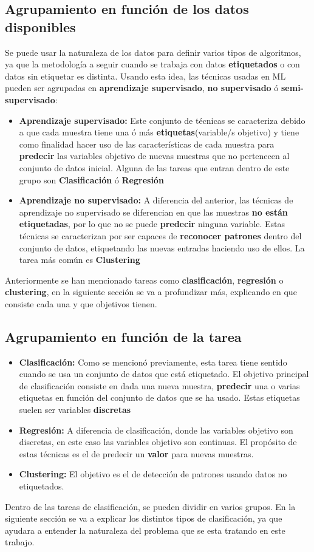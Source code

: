 \subsection{Agrupamiento en función de los datos disponibles}
Se puede usar la naturaleza de los datos para definir varios tipos de algoritmos, ya que la metodología a seguir cuando se trabaja con datos \textbf{etiquetados} o con datos sin etiquetar es distinta. Usando esta idea, las técnicas usadas en ML pueden ser agrupadas en \textbf{aprendizaje supervisado}, \textbf{no supervisado} ó \textbf{semi-supervisado}:
\begin{itemize}
	\item \textbf{Aprendizaje supervisado:} Este conjunto de técnicas se caracteriza debido a que cada muestra tiene una ó más \textbf{etiquetas}(variable/s objetivo) y tiene como finalidad hacer uso de las características de cada muestra para \textbf{predecir} las variables objetivo de nuevas muestras que no pertenecen al conjunto de datos inicial. Alguna de las tareas que entran dentro de este grupo son \textbf{Clasificación} ó \textbf{Regresión}
	\item \textbf{Aprendizaje no supervisado:} A diferencia del anterior, las técnicas de aprendizaje no supervisado se diferencian en que las muestras \textbf{no están etiquetadas}, por lo que no se puede \textbf{predecir} ninguna variable. Estas técnicas se caracterizan por ser capaces de \textbf{reconocer patrones} dentro del conjunto de datos, etiquetando las nuevas entradas haciendo uso de ellos. La tarea más común es \textbf{Clustering}
\end{itemize}
Anteriormente se han mencionado tareas como \textbf{clasificación}, \textbf{regresión} o \textbf{clustering}, en la siguiente sección se va a profundizar más, explicando en que consiste cada una y que objetivos tienen.
\subsection{Agrupamiento en función de la tarea}
\begin{itemize}
	\item \textbf{Clasificación:} Como se mencionó previamente, esta tarea tiene sentido cuando se usa un conjunto de datos que está etiquetado. El objetivo principal de clasificación consiste en dada una nueva muestra, \textbf{predecir} una o varias etiquetas en función del conjunto de datos que se ha usado. Estas etiquetas suelen ser variables \textbf{discretas}
	\item \textbf{Regresión:} A diferencia de clasificación, donde las variables objetivo son discretas, en este caso las variables objetivo son continuas. El propósito de estas técnicas es el de predecir un \textbf{valor} para nuevas muestras.
	\item \textbf{Clustering:} El objetivo es el de detección de patrones usando datos no etiquetados.
\end{itemize}
Dentro de las tareas de clasificación, se pueden dividir en varios grupos. En la siguiente sección se va a explicar los distintos tipos de clasificación, ya que ayudara a entender la naturaleza del problema que se esta tratando en este trabajo.
